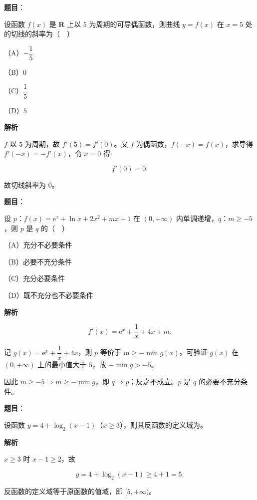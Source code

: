 \begin{answer}

\textbf{题目}：

设函数 $f(x)$ 是 $\mathbf R$ 上以 $5$ 为周期的可导偶函数，则曲线 $y=f(x)$ 在 $x=5$ 处的切线的斜率为（　）

（A）$-\dfrac15$

（B）$0$

（C）$\dfrac15$

（D）$5$

\textbf{解析}

$f$ 以 $5$ 为周期，故 $f'(5)=f'(0)$。又 $f$ 为偶函数，$f(-x)=f(x)$，求导得 $f'(-x)=-f'(x)$，令 $x=0$ 得

\nopagebreak[4]
\[f'(0)=0.\]

故切线斜率为 $0$。


\end{answer}
\begin{answer}

\textbf{题目}：

设 $p$：$f(x)=\mathrm e^x+\ln x+2x^2+mx+1$ 在 $(0,+\infty)$ 内单调递增，$q$：$m\geqslant-5$，则 $p$ 是 $q$ 的（　）

（A）充分不必要条件

（B）必要不充分条件

（C）充分必要条件

（D）既不充分也不必要条件

\textbf{解析}

\nopagebreak[4]
\[f'(x)=\mathrm e^x+\frac1x+4x+m.\]

记 $g(x)=\mathrm e^x+\dfrac1x+4x$，则 $p$ 等价于 $m\geqslant-\min g(x)$。可验证 $g(x)$ 在 $(0,+\infty)$ 上的最小值大于 $5$，故 $-\min g>-5$。

因此 $m\geqslant-5\Rightarrow m\geqslant-\min g$，即 $q\Rightarrow p$；反之不成立。$p$ 是 $q$ 的必要不充分条件。


\end{answer}
\begin{answer}

\textbf{题目}：

设函数 $y=4+\log_2(x-1)$（$x\geqslant3$），则其反函数的定义域为\gkblank{}。

\textbf{解析}

$x\geqslant3$ 时 $x-1\geqslant2$，故

\nopagebreak[4]
\[y=4+\log_2(x-1)\geqslant4+1=5.\]

反函数的定义域等于原函数的值域，即 $[5,+\infty)$。

\gkanswer{答案：$[5,+\infty)$。}

\end{answer}
